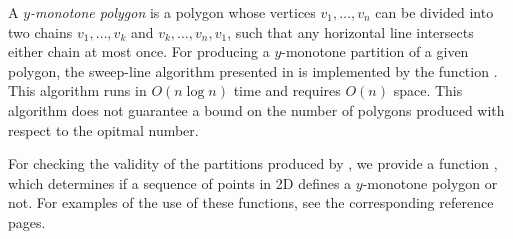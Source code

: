 A {\em $y$-monotone polygon}
is a polygon whose vertices $v_1, \ldots, v_n$ can be divided into two chains 
$v_1, \ldots, v_k$ and $v_k, \ldots, v_n, v_1$, such that any horizontal line 
intersects either chain at most once.  For producing a $y$-monotone partition 
of a given polygon, the sweep-line algorithm 
presented in \cite{bkos-cgaa-97} is implemented by the function
.  
This algorithm runs in $O(n \log n)$ time and requires $O(n)$ space.
This algorithm does not guarantee a bound on the number of polygons 
produced with respect to the opitmal number.

For checking the validity of the partitions produced by 
, we provide a function , 
which determines if a sequence of points in 2D defines a $y$-monotone
polygon or not.  For examples of the use of these functions, see the
corresponding reference pages.
